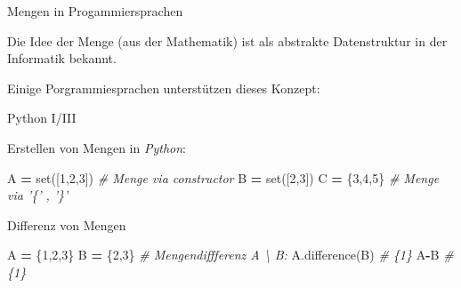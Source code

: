 \documentclass[12pt,ngerman,a4paper,ignorenonframetext,]{beamer}
\newenvironment{Shaded}{\begin{snugshade}}{\end{snugshade}}
\newcommand{\BuiltInTok}[1]{#1}
\newcommand{\CommentTok}[1]{\textcolor[rgb]{0.56,0.35,0.01}{\textit{#1}}}
\newcommand{\DecValTok}[1]{\textcolor[rgb]{0.00,0.00,0.81}{#1}}
\newcommand{\NormalTok}[1]{#1}
\newcommand{\OperatorTok}[1]{\textcolor[rgb]{0.81,0.36,0.00}{\textbf{#1}}}
\begin{document}
\begin{frame}{Mengen in Progammiersprachen}
\protect\hypertarget{mengen-in-progammiersprachen}{}

Die Idee der Menge (aus der Mathematik) ist als abstrakte Datenstruktur
in der Informatik bekannt.

Einige Porgrammiesprachen unterstützen dieses Konzept:


\end{frame}

\begin{frame}[fragile]{Python I/III}
\protect\hypertarget{python-iiii}{}

Erstellen von Mengen in \emph{Python}:

\begin{Shaded}
\begin{Highlighting}[]
\NormalTok{A }\OperatorTok{=} \BuiltInTok{set}\NormalTok{([}\DecValTok{1}\NormalTok{,}\DecValTok{2}\NormalTok{,}\DecValTok{3}\NormalTok{]) }\CommentTok{# Menge via constructor}
\NormalTok{B }\OperatorTok{=} \BuiltInTok{set}\NormalTok{([}\DecValTok{2}\NormalTok{,}\DecValTok{3}\NormalTok{])}
\NormalTok{C }\OperatorTok{=}\NormalTok{ \{}\DecValTok{3}\NormalTok{,}\DecValTok{4}\NormalTok{,}\DecValTok{5}\NormalTok{\} }\CommentTok{# Menge via '\{' , '\}'}
\end{Highlighting}
\end{Shaded}

Differenz von Mengen

\begin{Shaded}
\begin{Highlighting}[]
\NormalTok{A }\OperatorTok{=}\NormalTok{ \{}\DecValTok{1}\NormalTok{,}\DecValTok{2}\NormalTok{,}\DecValTok{3}\NormalTok{\} }
\NormalTok{B }\OperatorTok{=}\NormalTok{ \{}\DecValTok{2}\NormalTok{,}\DecValTok{3}\NormalTok{\}  }
\CommentTok{# Mengendiffferenz A \textbackslash{} B:}
\NormalTok{A.difference(B)  }\CommentTok{# \{1\}}
\NormalTok{A}\OperatorTok{-}\NormalTok{B  }\CommentTok{# \{1\}}
\end{Highlighting}
\end{Shaded}

\end{frame}
\end{document}
